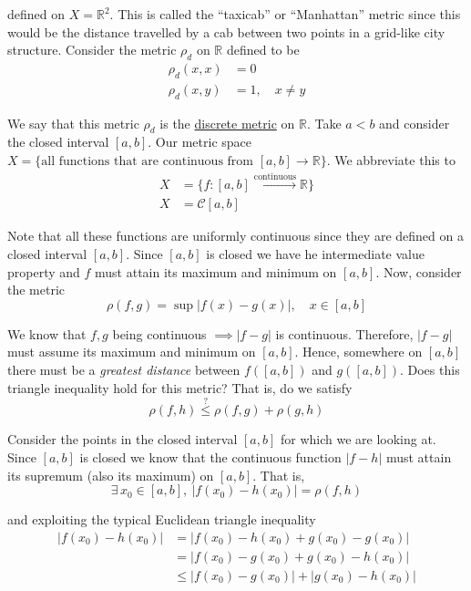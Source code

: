 \documentclass[12pt]{article}
\newlength\tindent
\renewcommand{\indent}{\hspace*{\tindent}}
\newcommand{\R}{\mathbb R}
\begin{document}
defined on $X = \R^2$. This is called the ``taxicab'' or ``Manhattan'' metric since this would be the distance travelled by a cab between two points in a grid-like city structure. Consider the metric $\rho_d$ on $\R$ defined to be
\begin{align*}
	\rho_d(x, x) &= 0 \\
	\rho_d(x, y) &= 1, \quad x \neq y
\end{align*}

\indent We say that this metric $\rho_d$ is the \underline{discrete metric} on $\R$. Take $a < b$ and consider the closed interval $[a,b]$. Our metric space $X = \{\text{all functions that are continuous from $[a,b]\to\R$}\}$. We abbreviate this to
\begin{align*}
	X &= \{f:[a,b]\stackrel{\text{continuous}}{\longrightarrow}\R\} \\
	X &= \mathcal C[a,b]
\end{align*}

\indent Note that all these functions are uniformly continuous since they are defined on a closed interval $[a,b]$. Since $[a,b]$ is closed we have he intermediate value property and $f$ must attain its maximum and minimum on $[a,b]$. Now, consider the metric
\begin{equation*}
	\rho(f, g) = \sup |f(x) - g(x)|, \quad x \in [a,b]
\end{equation*}

\indent We know that $f,g$ being continuous $\implies |f - g|$ is continuous. Therefore, $|f - g|$ must assume its maximum and minimum on $[a,b]$. Hence, somewhere on $[a,b]$ there must be a {\em greatest distance} between $f([a,b])$ and $g([a,b])$. Does this triangle inequality hold for this metric? That is, do we satisfy
\begin{equation*}
	\rho(f, h) \stackrel{?}{\leq} \rho(f,g) + \rho(g,h)
\end{equation*}

\indent Consider the points in the closed interval $[a,b]$ for which we are looking at. Since $[a,b]$ is closed we know that the continuous function $|f - h|$ must attain its supremum (also its maximum) on $[a,b]$. That is,
\begin{equation*}
	\exists\,x_0 \in [a,b],~|f(x_0) - h(x_0)| = \rho(f, h)
\end{equation*}

and exploiting the typical Euclidean triangle inequality
\begin{align*}
	|f(x_0) - h(x_0)| &= |f(x_0) - h(x_0) + g(x_0) - g(x_0)| \\
	&= |f(x_0) - g(x_0) + g(x_0) - h(x_0)| \\
	&\leq |f(x_0) - g(x_0)| + |g(x_0) - h(x_0)|
\end{align*}
\end{document}
